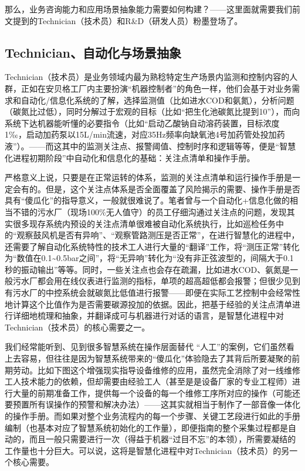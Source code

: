\documentclass[
]{book}
\begin{document}
那么，业务咨询能力和应用场景抽象能力需要如何构建？------这里面就需要我们前文提到的Technician（技术员）和R\&D（研发人员）粉墨登场了。

\hypertarget{technicianux81eaux52a8ux5316ux4e0eux573aux666fux62bdux8c61}{%
\subsection{Technician、自动化与场景抽象}\label{technicianux81eaux52a8ux5316ux4e0eux573aux666fux62bdux8c61}}

Technician（技术员）是业务领域内最为熟稔特定生产场景内监测和控制内容的人群，正如在安贝格工厂内主要扮演``机器控制者''的角色一样，他们会基于对业务需求和自动化/信息化系统的了解，选择监测值（比如进水COD和氨氮），分析问题（碳氮比过低），同时分解过于宏观的目标（比如``把生化池碳氮比提到10''），而向系统下达机器能听懂的必要指令（比如``启动乙酸钠自动溶药装置，目标浓度1‰，启动加药泵以15L/min流速，对应35Hz频率向缺氧池4号加药管处投加药液''）。------而这其中的监测关注点、报警阈值、控制时序和逻辑等等，便是``智慧化进程初期阶段''中自动化和信息化的基础：关注点清单和操作手册。

严格意义上说，只要是在正常运转的体系，监测的关注点清单和运行操作手册是一定会有的。但是，这个关注点体系是否全面覆盖了风险揭示的需要、操作手册是否具有``傻瓜化''的指导意义，一般就很难说了。笔者曾与一个自动化+信息化做的相当不错的污水厂（现场100\%无人值守）的员工仔细沟通过关注点的问题，发现其实很多现存系统内预设的关注点清单很难被自动化系统执行，比如巡检任务中的``观察鼓风机是否有异响''、``观察管路测压是否正常''，在进行智慧化的进程中，还需要了解自动化系统特性的技术工人进行大量的``翻译''工作，将``测压正常''转化为``数值在0.1\textasciitilde0.5bar之间''，将``无异响''转化为``没有非正弦波型的，间隔大于0.1秒的振动输出''等等。同时，一些关注点也会存在疏漏，比如进水COD、氨氮是一般污水厂都会用在线仪表进行监测的指标，单项的超高超低都会报警；但很少见到有污水厂的中控系统会就碳氮比低值进行报警------即便在实际工艺控制中会经常性地计算这个比值作为是否需要碳源投加的依据。因此，把基于经验的关注点清单进行详细地梳理和抽象，并翻译成可与机器进行对话的语言，是智慧化进程中对Technician（技术员）的核心需要之一。

我们经常能听到、见到很多智慧系统在操作层面替代 ``人工''的案例，它们虽然看上去容易，但往往是因为智慧系统带来的``傻瓜化''体验隐去了其背后所要凝聚的前期劳动。比如下图这个增强现实指导设备维修的应用，虽然完全消除了对一线维修工人技术能力的依赖，但却需要由经验工人（甚至是是设备厂家的专业工程师）进行大量的前期准备工作，提供每一个设备的每一个维修工序所对应的操作（可能还要预置所有误操作的预警和解决办法）------这其实就相当于制作了一部音像一体化的操作手册。而如果对整个业务流程内的每一个步骤、关键工艺段进行如此的手册编制（也基本对应了智慧系统初始化的工作量），即便指南的整个采集过程都是自动的，而且一般只需要进行一次（得益于机器``过目不忘''的本领），所需要凝结的工作量也十分巨大。可以说，这将是智慧化进程中对Technician（技术员）的另一个核心需要。
\end{document}
